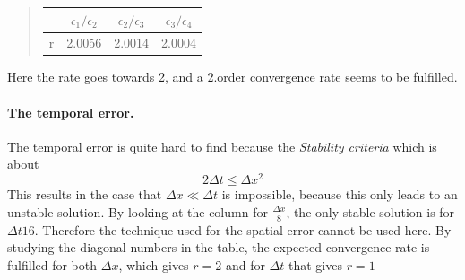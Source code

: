 \documentclass[%
twoside,                 %
final,                   %
10pt]{article}
\begin{document}
\begin{quote}
\begin{tabular}{cccc}
\hline
\multicolumn{1}{c}{  } & \multicolumn{1}{c}{ $\epsilon_1/\epsilon_2$ } & \multicolumn{1}{c}{ $\epsilon_2/\epsilon_3$ } & \multicolumn{1}{c}{ $\epsilon_3/\epsilon_4$ } \\
\hline
r                       & 2.0056                  & 2.0014                  & 2.0004                  \\
\hline
\end{tabular}
\end{quote}

\noindent
Here the rate goes towards 2, and a 2.order convergence rate seems to be fulfilled.
\paragraph{The temporal error.}
The temporal error is quite hard to find because the \emph{Stability criteria} which is about
\begin{equation} \label{eq:stability_cr}
 2\Delta t \leq \Delta x^2
\end{equation}
This results in the case that $\Delta x \ll \Delta t$ is impossible, because this only leads to an unstable solution. By looking at the column for $\frac{\Delta x}{8}$, the only stable solution is for ${\Delta t}{16}$. Therefore the technique used for the spatial error cannot be used here. By studying the diagonal numbers in the table, the expected convergence rate is fulfilled for both $\Delta x$, which gives $r = 2$ and for $\Delta t$ that gives $r=1$   
\end{document}
